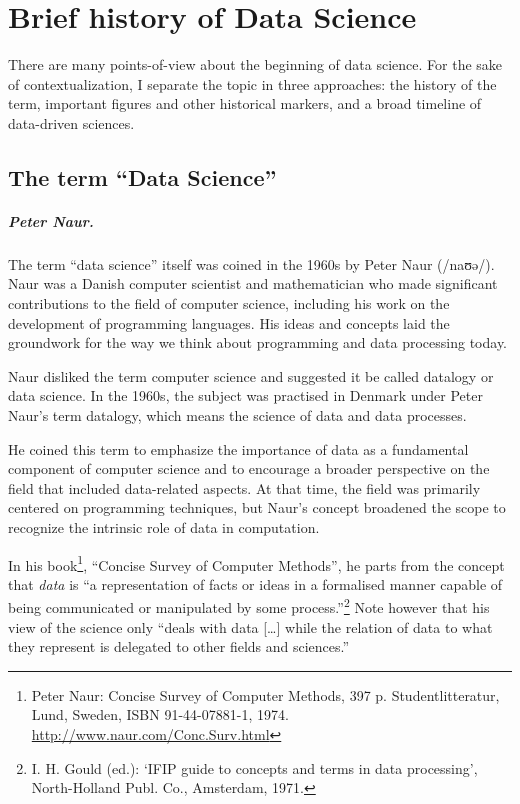\chapter{Brief history of Data Science}

There are many points-of-view about the beginning of data science.  For the sake of
contextualization, I separate the topic in three approaches: the history of the term,
important figures and other historical markers, and a broad timeline of data-driven
sciences.

\section{The term ``Data Science''}

\paragraph{Peter Naur.}

The term ``data science'' itself was coined in the 1960s by Peter Naur (/naʊə/). Naur was
a Danish computer scientist and mathematician who made significant contributions to the
field of computer science, including his work on the development of programming languages.
His ideas and concepts laid the groundwork for the way we think about programming and data
processing today.

Naur disliked the term computer science and suggested it be called datalogy or data
science.  In the 1960s, the subject was practised in Denmark under Peter
Naur's term datalogy, which means the science of data and data processes.

He coined this term to emphasize the importance of data as a fundamental component of
computer science and to encourage a broader perspective on the field that included
data-related aspects. At that time, the field was primarily centered on programming
techniques, but Naur's concept broadened the scope to recognize the intrinsic role of data
in computation.

In his book\footnote{Peter Naur: Concise Survey of Computer Methods, 397 p.
Studentlitteratur, Lund, Sweden, ISBN 91-44-07881-1, 1974.
\url{http://www.naur.com/Conc.Surv.html}}, ``Concise Survey of Computer Methods'', he
parts from the concept that \emph{data} is ``a representation of facts or ideas in a
formalised manner capable of being communicated or manipulated by some
process.''\footnote{I. H. Gould (ed.): ‘IFIP guide to concepts and terms in data
processing’, North-Holland Publ. Co., Amsterdam, 1971.} Note however that his view of the
science only ``deals with data [\dots] while the relation of data to what they represent
is delegated to other fields and sciences.''

